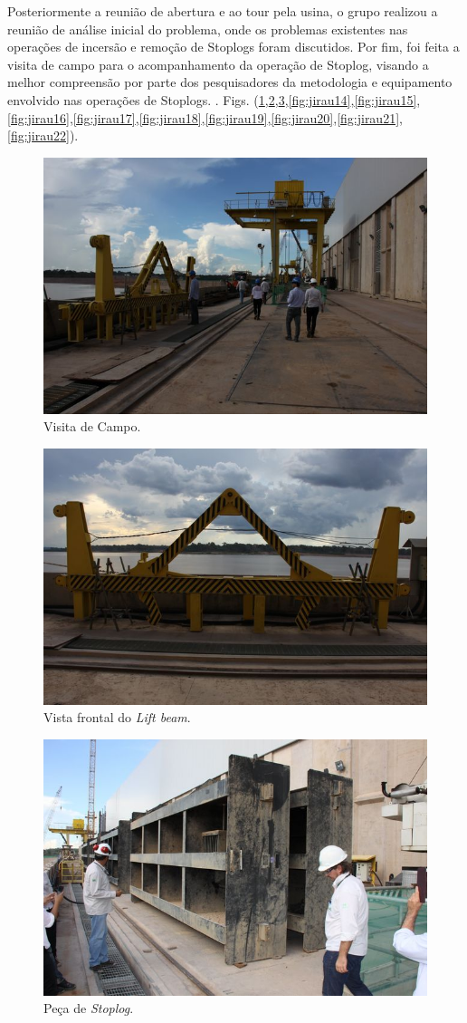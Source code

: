 \clearpage

Posteriormente a reunião de abertura e ao tour pela usina, 
o grupo realizou a reunião de análise inicial do problema, onde os problemas
existentes nas operações de incersão e remoção de Stoplogs foram discutidos. 
Por fim, foi feita a visita de campo para o acompanhamento da operação de
Stoplog, visando a melhor compreensão por parte dos pesquisadores da metodologia e equipamento envolvido nas operações de Stoplogs. . Figs.
(\ref{fig:jirau9},\ref{fig:jirau11},\ref{fig:jirau13},\ref{fig:jirau14},\ref{fig:jirau15},\ref{fig:jirau16},\ref{fig:jirau17},\ref{fig:jirau18},\ref{fig:jirau19},\ref{fig:jirau20},\ref{fig:jirau21},\ref{fig:jirau22}).


\begin{figure}[h!]
    \centering \includegraphics[width=0.6\columnwidth]{figs/jirau/jirau_09}
    \caption{Visita de Campo.}
    \label{fig:jirau9}
\end{figure}

\begin{figure}[h!]
    \centering \includegraphics[width=0.6\columnwidth]{figs/jirau/jirau_11}
    \caption{Vista frontal do \emph{Lift beam}.}
    \label{fig:jirau11}
\end{figure}

\begin{figure}[h!]
    \centering \includegraphics[width=0.6\columnwidth]{figs/jirau/jirau_13}
    \caption{Peça de \emph{Stoplog}.}
    \label{fig:jirau13}
\end{figure}

